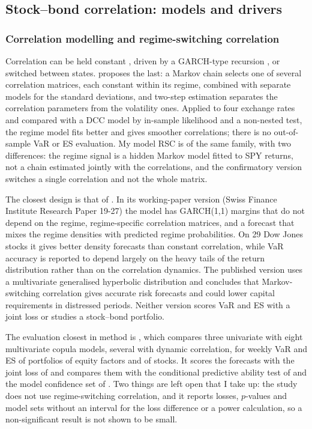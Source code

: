 \subsection{Stock--bond correlation: models and drivers}

\subsubsection{Correlation modelling and regime-switching correlation}\label{sec:lit-corr}

Correlation can be held constant \citep{bollerslev1990}, driven by a GARCH-type recursion \citep{engle2002}, or switched between states. \citet{pelletier2006} proposes the last: a Markov chain selects one of several correlation matrices, each constant within its regime, combined with separate models for the standard deviations, and two-step estimation separates the correlation parameters from the volatility ones. Applied to four exchange rates and compared with a DCC model by in-sample likelihood and a non-nested test, the regime model fits better and gives smoother correlations; there is no out-of-sample VaR or ES evaluation. My model RSC is of the same family, with two differences: the regime signal is a hidden Markov model fitted to SPY returns, not a chain estimated jointly with the correlations, and the confirmatory version switches a single correlation and not the whole matrix.

The closest design is that of \citet{paolella2019}. In its working-paper version (Swiss Finance Institute Research Paper 19-27) the model has GARCH(1,1) margins that do not depend on the regime, regime-specific correlation matrices, and a forecast that mixes the regime densities with predicted regime probabilities. On 29 Dow Jones stocks it gives better density forecasts than constant correlation, while VaR accuracy is reported to depend largely on the heavy tails of the return distribution rather than on the correlation dynamics. The published version uses a multivariate generalised hyperbolic distribution and concludes that Markov-switching correlation gives accurate risk forecasts and could lower capital requirements in distressed periods. Neither version scores VaR and ES with a joint loss or studies a stock--bond portfolio.

The evaluation closest in method is \citet{fortin2023}, which compares three univariate with eight multivariate copula models, several with dynamic correlation, for weekly VaR and ES of portfolios of equity factors and of stocks. It scores the forecasts with the joint loss of \citet{patton2019} and compares them with the conditional predictive ability test of \citet{giacomini2006} and the model confidence set of \citet{hansen2011}. Two things are left open that I take up: the study does not use regime-switching correlation, and it reports losses, $p$-values and model sets without an interval for the loss difference or a power calculation, so a non-significant result is not shown to be small.

